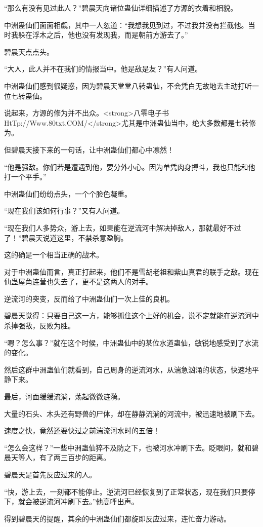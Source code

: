 \begin{this_body}
“那么有没有见过此人？”碧晨天向诸位蛊仙详细描述了方源的衣着和相貌。

中洲蛊仙们面面相觑，其中一人忽道：“我想我见到过，不过我并没有拦截他。当时我躲在浮木之后，他也没有发现我，而是朝前方游去了。”

碧晨天点点头。

“大人，此人并不在我们的情报当中。他是敌是友？”有人问道。

中洲蛊仙们感到很疑惑，因为碧晨天堂堂八转蛊仙，不会凭白无故地去主动打听一位七转蛊仙。

说起来，方源的修为并不出众。<strong>八零电子书HtTp://Www.80txt.COM/</strong>尤其是中洲蛊仙当中，绝大多数都是七转修为。

但碧晨天接下来的一句话，让中洲蛊仙们都心中凛然！

“他是强敌。你们若是遭遇到他，要分外小心。因为单凭肉身搏斗，我也只能和他打一个平手。”

中洲蛊仙们纷纷点头，一个个脸色凝重。

“现在我们该如何行事？”又有人问道。

“现在我们人多势众，游上去，如果能在逆流河中解决掉敌人，那就最好不过了！”碧晨天说道这里，不禁杀意盈胸。

这的确是一个相当正确的战术。

对于中洲蛊仙而言，真正打起来，他们不是雪胡老祖和紫山真君的联手之敌。现在仙蛊屋角连营也失去了，更不是这两人的对手。

逆流河的突变，反而给了中洲蛊仙们一次上佳的良机。

碧晨天觉得：只要自己这一方，能够抓住这个上好的机会，说不定就能在逆流河中杀掉强敌，反败为胜。

“嗯？怎么事？”就在这个时候，中洲蛊仙中的某位水道蛊仙，敏锐地感受到了水流的变化。

然后这群中洲蛊仙们就看到，自己周身的逆流河水，从湍急汹涌的状态，快速地平静下来。

最后，河面缓缓流淌，荡起微微涟漪。

大量的石头、木头还有野兽的尸体，却在静静流淌的河流中，被迅速地被刷下去。

速度之快，竟然还要快过之前湍流河水时的五倍！

“怎么会这样？”一些中洲蛊仙猝不及防之下，也被河水冲刷下去。眨眼间，就和碧晨天等人，有了两三百步的距离。

碧晨天是首先反应过来的人。

“快，游上去，一刻都不能停止。逆流河已经恢复到了正常状态，现在我们只要停下，就会被逆流河冲刷下去。”他高呼出声。

得到碧晨天的提醒，其余的中洲蛊仙们都旋即反应过来，连忙奋力游动。


\end{this_body}
